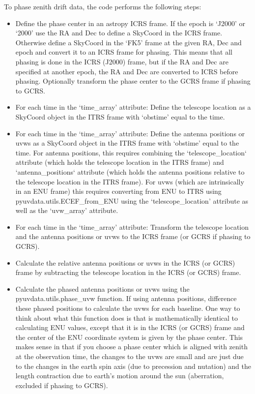 \documentclass[11pt, oneside]{article}   	%
\begin{document}
To phase zenith drift data, the code performs the following steps:
\begin{itemize}
\item{Define the phase center in an astropy ICRS frame. If the epoch is `J2000' or `2000' use the RA and Dec to define a SkyCoord in the ICRS frame. Otherwise define a SkyCoord in the `FK5' frame at the given RA, Dec and epoch and convert it to an ICRS frame for phasing. This means that all phasing is done in the ICRS (J2000) frame, but if the RA and Dec are specified at another epoch, the RA and Dec are converted to ICRS before phasing. Optionally transform the phase center to the GCRS frame if phasing to GCRS.}
\item{For each time in the `time\_array' attribute: Define the telescope location as a SkyCoord object in the ITRS frame with `obstime' equal to the time.}
\item{For each time in the `time\_array' attribute: Define the antenna positions or uvws as a SkyCoord object in the ITRS frame with `obstime' equal to the time. For antenna positions, this requires combining the `telescope\_location` attribute (which holds the telescope location in the ITRS frame) and `antenna\_positions` attribute (which holds the antenna positions relative to the telescope location in the ITRS frame). For uvws (which are intrinsically in an ENU frame) this requires converting from ENU to ITRS using pyuvdata.utils.ECEF\_from\_ENU using the `telescope\_location' attribute as well as the `uvw\_array' attribute.}
\item{For each time in the `time\_array' attribute: Transform the telescope location and the antenna positions or uvws to the ICRS frame (or GCRS if phasing to GCRS).}
\item{Calculate the relative antenna positions or uvws in the ICRS (or GCRS) frame by subtracting the telescope location in the ICRS (or GCRS) frame.}
\item{Calculate the phased antenna positions or uvws using the pyuvdata.utils.phase\_uvw function. If using antenna positions, difference these phased positions to calculate the uvws for each baseline. One way to think about what this function does is that is mathematically identical to calculating ENU values, except that it is in the ICRS (or GCRS) frame and the center of the ENU coordinate system is given by the phase center. This makes sense in that if you choose a phase center which is aligned with zenith at the observation time, the changes to the uvws are small and are just due to the changes in the earth spin axis (due to precession and nutation) and the length contraction due to earth's motion around the sun (aberration, excluded if phasing to GCRS).}
\end{itemize}
\end{document}

